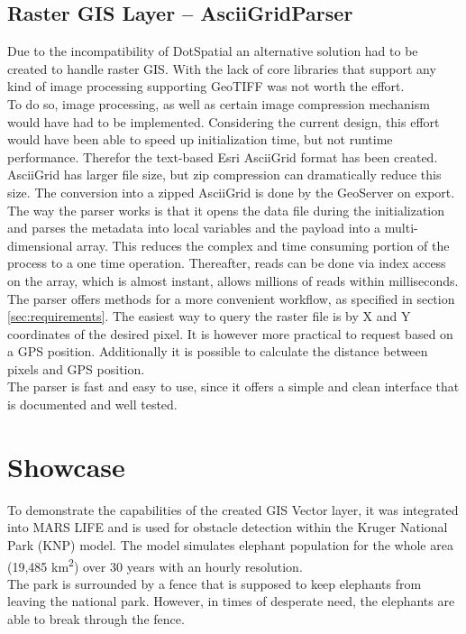 \subsection{Raster GIS Layer -- AsciiGridParser}
\label{sec:parser}
Due to the incompatibility of DotSpatial an alternative solution had to be created to handle raster GIS. With the lack of core libraries that support any kind of image processing supporting GeoTIFF was not worth the effort.\\
To do so, image processing, as well as certain image compression mechanism would have had to be implemented. Considering the current design, this effort would have been able to speed up initialization time, but not runtime performance. Therefor the text-based Esri AsciiGrid format has been created.\\
AsciiGrid has larger file size, but zip compression can dramatically reduce this size. The conversion into a zipped AsciiGrid is done by the GeoServer on export.\\
The way the parser works is that it opens the data file during the initialization and parses the metadata into local variables and the payload into a multi-dimensional array. This reduces the complex and time consuming portion of the process to a one time operation. Thereafter, reads can be done via index access on the array, which is almost instant, allows millions of reads within milliseconds.\\
The parser offers methods for a more convenient workflow, as specified in section \ref{sec:requirements}. The easiest way to query the raster file is by X and Y coordinates of the desired pixel. It is however more practical to request based on a GPS position. Additionally it is possible to calculate the distance between pixels and GPS position.\\
The parser is fast and easy to use, since it offers a simple and clean interface that is documented and well tested.


\section{Showcase}
To demonstrate the capabilities of the created GIS Vector layer, it was integrated into MARS LIFE and is used for obstacle detection within the Kruger National Park (KNP) model. The model simulates elephant population for the whole area (19,485 \si{km^{2}}) over 30 years with an hourly resolution.\\
The park is surrounded by a fence that is supposed to keep elephants from leaving the national park. However, in times of desperate need, the elephants are able to break through the fence.\\


